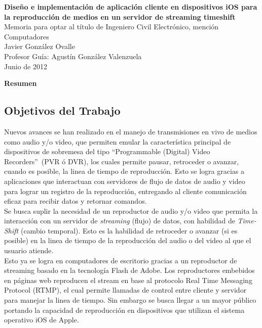 \newpage
\thispagestyle{empty}
\begin{center}
 \Large \textbf{Diseño e implementación de aplicación cliente en dispositivos iOS para la reproducción de medios en un servidor de streaming timeshift}\\

\normalsize Memoria para optar al título de Ingeniero Civil Electrónico, mención Computadores \\
\normalsize Javier González Ovalle \\
\normalsize Profesor Guía: Agustín González Valenzuela \\
\normalsize Junio de 2012

\Large \textbf{Resumen}

\end{center}
\normalsize
\subsection*{Objetivos del Trabajo}
\normalsize

Nuevos avances se han realizado en el manejo de transmisiones en vivo de medios como audio y/o video, que permiten emular la característica principal de dispositivos de sobremesa del tipo \textquotedblleft Programmable (Digital) Video Recorders\textquotedblright \ (PVR ó DVR), los cuales permite pausar, retroceder o avanzar, cuando es posible, la linea de tiempo de reproducción. Esto se logra gracias a aplicaciones que interactuan con servidores de flujo de datos de audio y video para lograr un registro de la reproducción, entregando al cliente comunicación eficaz para recibir datos y retornar comandos.\\ 

Se busca suplir la necesidad de un reproductor de audio y/o video que permita la interacción con un servidor de \textit{streaming} (flujo) de datos, con habilidad de \textit{Time-Shift} (cambio temporal). Esto es la habilidad de retroceder o avanzar (si es posible) en la linea de tiempo de la reproducción del audio o del video al que el usuario atiende.\\

Esto ya se logra en computadores de escritorio gracias a un reproductor de streaming basado en la tecnolog\'ia Flash de Adobe. Los reproductores embebidos en p\'aginas web reproducen el stream en base al protocolo Real Time Messaging Protocol (RTMP), el cual permite llamadas de control entre cliente y servidor para manejar la linea de tiempo. Sin embargo se busca llegar a un mayor público portando la capacidad de reproducci\'on en dispositivos que utilizan el sistema operativo iOS de Apple.\\

